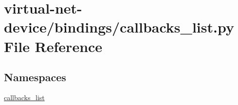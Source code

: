 \hypertarget{virtual-net-device_2bindings_2callbacks__list_8py}{}\section{virtual-\/net-\/device/bindings/callbacks\+\_\+list.py File Reference}
\label{virtual-net-device_2bindings_2callbacks__list_8py}
\subsection*{Namespaces}
\begin{DoxyCompactItemize}
\item 
 \hyperlink{namespacecallbacks__list}{callbacks\+\_\+list}
\end{DoxyCompactItemize}
